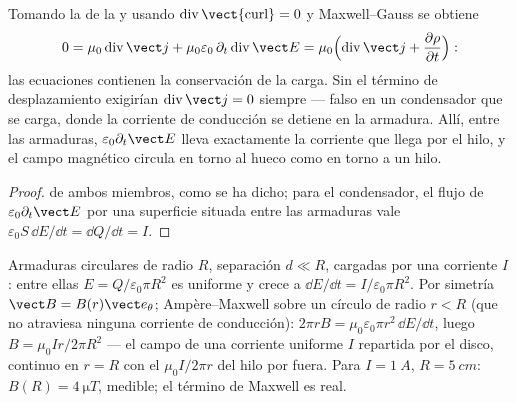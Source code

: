 \begin{proposition}\label{prop:b2:maxwell-equations:displacement}
Tomando la  de la  y usando
$\operatorname{div}\operatorname{\vect{curl}} = 0$ y Maxwell--Gauss se obtiene
\[
0 = \mu_0\operatorname{div}\vect j + \mu_0\varepsilon_0\,\partial_t\operatorname{div}\vect E
= \mu_0\Bigl(\operatorname{div}\vect j + \frac{\partial\rho}{\partial t}\Bigr) :
\]
las ecuaciones contienen la conservación de la carga. Sin el término de
desplazamiento exigirían $\operatorname{div}\vect j = 0$ siempre --- falso en
un condensador que se carga, donde la corriente de conducción se detiene
en la armadura. Allí, entre las armaduras, $\varepsilon_0\partial_t\vect E$ lleva
exactamente la corriente que llega por el hilo, y el campo magnético
circula en torno al hueco como en torno a un hilo.
\end{proposition}

\begin{proof}
 de ambos miembros, como se ha dicho; para el condensador, el
flujo de $\varepsilon_0\partial_t\vect E$ por una superficie situada entre las armaduras vale
$\varepsilon_0S\,\dd E/\dd t = \dd Q/\dd t = I$.
\end{proof}

\begin{example}\label{ex:b2:maxwell-equations:capacitor}
Armaduras circulares de radio $R$, separación $d \ll R$, cargadas por una
corriente $I$: entre ellas $E = Q/\varepsilon_0\pi R^2$ es uniforme y crece a $\dd E/
\dd t = I/\varepsilon_0\pi R^2$. Por simetría $\vect B = B(r)\vect e_\theta$; Ampère--Maxwell
sobre un círculo de radio $r < R$ (que no atraviesa ninguna corriente de conducción): $2\pi rB
= \mu_0\varepsilon_0\pi r^2\,\dd E/\dd t$, luego $B = \mu_0Ir/2\pi R^2$ --- el campo de una
corriente uniforme $I$ repartida por el disco, continuo en $r = R$ con el
$\mu_0I/2\pi r$ del hilo por fuera. Para $I = \qty{1}{A}$, $R = \qty{5}{cm}$: $B(R) =
\qty{4}{\micro T}$, medible; el término de Maxwell es real.
\end{example}

